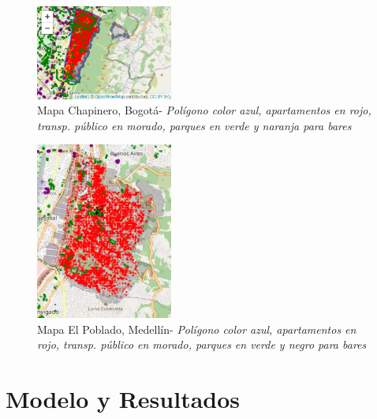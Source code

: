 \documentclass[conference, 10pt]{IEEEtran}
\begin{document}
\begin{figure}[htbp]
\centerline{\includegraphics[width=0.4\textwidth]{../Vistas/Mapa_Chapinero_2.2.png}}
\caption{Mapa Chapinero, Bogotá- \textit{Polígono color azul, apartamentos en rojo, transp. público en morado, parques en verde y naranja para bares}}
\label{fig_1}
\end{figure}

\begin{figure}[htbp]
\centerline{\includegraphics[width=0.4\textwidth]{../Vistas/MapaPoblado1.png}}
\caption{Mapa El Poblado, Medellín- \textit{Polígono color azul, apartamentos en rojo, transp. público en morado, parques en verde y negro para bares}}
\label{fig_2}
\end{figure}

\section{Modelo y Resultados}
\end{document}
